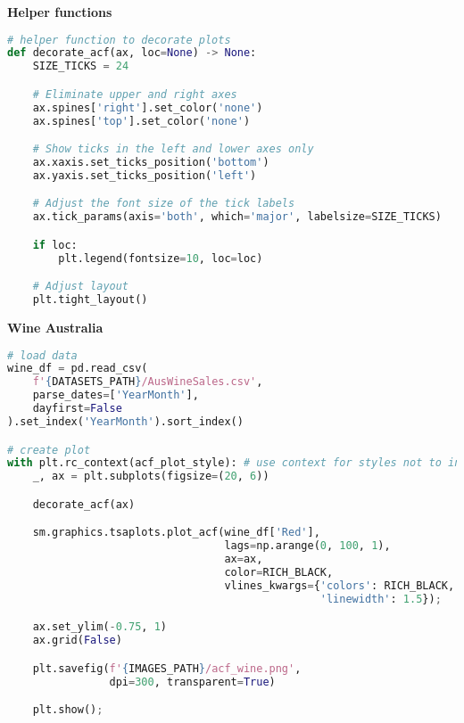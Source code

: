 {\noindent\hspace{-12.5pt}\normalsize\bfseries Helper functions}\vspace{-10pt}
\begin{center}
  \begin{lstlisting}[language=Python]
# helper function to decorate plots
def decorate_acf(ax, loc=None) -> None:
    SIZE_TICKS = 24

    # Eliminate upper and right axes
    ax.spines['right'].set_color('none')
    ax.spines['top'].set_color('none')

    # Show ticks in the left and lower axes only
    ax.xaxis.set_ticks_position('bottom')
    ax.yaxis.set_ticks_position('left')

    # Adjust the font size of the tick labels
    ax.tick_params(axis='both', which='major', labelsize=SIZE_TICKS)

    if loc:
        plt.legend(fontsize=10, loc=loc)

    # Adjust layout
    plt.tight_layout()
  \end{lstlisting}
\end{center}


{\noindent\hspace{-12.5pt}\normalsize\bfseries Wine Australia}\vspace{-10pt}
\begin{center}
  \begin{lstlisting}[language=Python, 
  caption={Коррелограмма для объёма продаж красного вина в Австралии.}, 
  label={lst:acf_wine}]
# load data
wine_df = pd.read_csv(
    f'{DATASETS_PATH}/AusWineSales.csv',
    parse_dates=['YearMonth'],
    dayfirst=False
).set_index('YearMonth').sort_index()

# create plot
with plt.rc_context(acf_plot_style): # use context for styles not to interfere
    _, ax = plt.subplots(figsize=(20, 6))

    decorate_acf(ax)

    sm.graphics.tsaplots.plot_acf(wine_df['Red'], 
                                  lags=np.arange(0, 100, 1), 
                                  ax=ax, 
                                  color=RICH_BLACK, 
                                  vlines_kwargs={'colors': RICH_BLACK, 
                                                 'linewidth': 1.5});

    ax.set_ylim(-0.75, 1)
    ax.grid(False)

    plt.savefig(f'{IMAGES_PATH}/acf_wine.png', 
                dpi=300, transparent=True)

    plt.show();
  \end{lstlisting}
\end{center}

